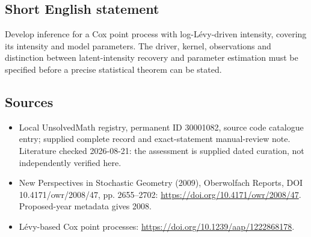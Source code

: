 \documentclass[11pt]{article}
\begin{document}
\subsection{Short English statement}
Develop inference for a Cox point process with log-Lévy-driven intensity, covering its intensity and model parameters. The driver, kernel, observations and distinction between latent-intensity recovery and parameter estimation must be specified before a precise statistical theorem can be stated.
\subsection{Sources}
\begin{itemize}
\item Local UnsolvedMath registry, permanent ID 30001082, source code catalogue entry; supplied complete record and exact-statement manual-review note. Literature checked 2026-08-21: the assessment is supplied dated curation, not independently verified here.
\item New Perspectives in Stochastic Geometry (2009), Oberwolfach Reports, DOI 10.4171/owr/2008/47, pp. 2655--2702: \url{https://doi.org/10.4171/owr/2008/47}. Proposed-year metadata gives 2008.
\item Lévy-based Cox point processes: \url{https://doi.org/10.1239/aap/1222868178}.
\end{itemize}
\end{document}

